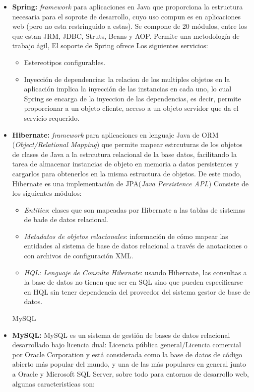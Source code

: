 \begin{itemize}
    \item \textbf{Spring:} \textit{framework} para aplicaciones en Java que proporciona la estructura necesaria para el soprote de desarrollo, cuyo uso compun es en aplicaciones web (pero no esta restringuido a estas). Se compone de 20 módulos, entre los que estan JRM, JDBC, Struts, Beans y AOP. Permite una metodología de trabajo ágil, El soporte de Spring ofrece Los siguientes servicios:
        \begin{itemize}
            \item Estereotipos configurables.
            \item Inyección de dependencias: la relacion de los multiples objetos en la aplicación implica la inyección de las instancias en cada uno, lo cual Spring se encarga de la inyeccion de las dependencias, es decir, permite proporcionar a un objeto cliente, acceso a un objeto servidor que da el servicio requerido.
        \end{itemize}
        
        
    \item \textbf{Hibernate:} \textit{framework} para aplicaciones en lenguaje Java de ORM (\textit{Object/Relational Mapping}) que permite mapear estrcuturas de los objetos de clases de Java a la estrcutura relacional de la base datos, facilitando la tarea de almacenar instancias de objeto en memoria a datos persistentes y cargarlos para obtenerlos en la misma estructura de objetos. De este modo, Hibernate es una implementación de JPA(\textit{Java Persistence API}.)
    Consiste de los siguientes módulos:
        \begin{itemize}
            \item \textit{Entities}: clases que son mapeadas por Hibernate a las tablas de sistemas de bade de datos relacional.
            \item \textit{Metadatos de objetos relacionales}: información de cómo mapear las entidades al sistema de base de datos relacional a través de anotaciones o con archivos de configuración XML.
            \item \textit{HQL: Lenguaje de Consulta Hibernate}: usando Hibernate, las consultas a la base de datos no tienen que ser en SQL sino que pueden especificarse en HQL sin tener dependencia del proveedor del sistema gestor de base de datos.
        \end{itemize}


        
     MySQL
    \item \textbf{MySQL:} MySQL es un sistema de gestión de bases de datos relacional desarrollado bajo licencia dual: Licencia pública general/Licencia comercial por Oracle Corporation y está considerada como la base de datos de código abierto más popular del mundo, y una de las más populares en general junto a Oracle y Microsoft SQL Server, sobre todo para entornos de desarrollo web, algunas caracteristicas son:


\end{itemize}
